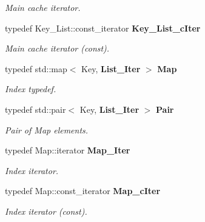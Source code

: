 \begin{DoxyCompactItemize}
\begin{DoxyCompactList}\small\item\em Main cache iterator. \item\end{DoxyCompactList}\item 
typedef Key\_\-List::const\_\-iterator {\bf Key\_\-List\_\-cIter}\label{classLRUCache_a5bfc5b2fb49045d46214f92e8019307f}

\begin{DoxyCompactList}\small\item\em Main cache iterator (const). \item\end{DoxyCompactList}\item 
typedef std::map$<$ Key, {\bf List\_\-Iter} $>$ {\bf Map}\label{classLRUCache_acf7b527935fba37e33b8f2e6de92bfb0}

\begin{DoxyCompactList}\small\item\em Index typedef. \item\end{DoxyCompactList}\item 
typedef std::pair$<$ Key, {\bf List\_\-Iter} $>$ {\bf Pair}\label{classLRUCache_aa10db4fd28c9946c2ef845e2f56c48bf}

\begin{DoxyCompactList}\small\item\em Pair of Map elements. \item\end{DoxyCompactList}\item 
typedef Map::iterator {\bf Map\_\-Iter}\label{classLRUCache_aa95c01d582d31a9295b84caf12d42ef4}

\begin{DoxyCompactList}\small\item\em Index iterator. \item\end{DoxyCompactList}\item 
typedef Map::const\_\-iterator {\bf Map\_\-cIter}\label{classLRUCache_a77cae4f619439bdf7cb7098ed87c3583}

\begin{DoxyCompactList}\small\item\em Index iterator (const). \item\end{DoxyCompactList}\end{DoxyCompactItemize}

